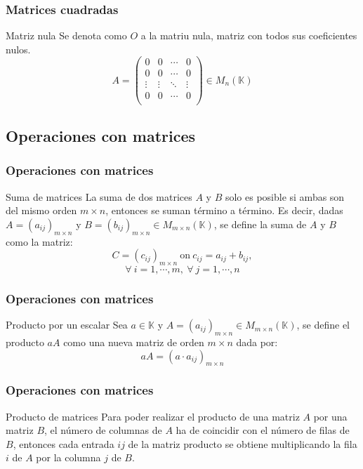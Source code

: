 \documentclass[aspectratio=169]{beamer}
\begin{document}
 \begin{frame}
  \frametitle{Matrices cuadradas}
   \begin{block}{Matriz nula}
Se denota como $O$ a la matriu nula, matriz con todos sus coeficientes nulos.\[ A =  \left(\begin{matrix} %
      0 & 0 & \cdots & 0 \\
      0 & 0 & \cdots & 0 \\
  \vdots & \vdots & \ddots & \vdots \\
   0 & 0 & \cdots & 0 \\
    \end{matrix}\right) \in M_{ n} (\mathbb{K})\]
  \end{block}
 \end{frame}
 
 
 
 
 
 \subsection{Operaciones con matrices}

 \begin{frame}
  \frametitle{Operaciones con matrices}
   \begin{block}{Suma de matrices}
La suma de dos matrices $A$ y $B$ solo es posible si ambas son del mismo orden $m\times n$, entonces se suman t\'ermino a t\'ermino. Es decir, dadas $A=(a_{ij})_{m\times n}$ y $B=(b_{ij})_{m\times n}\in M_{m\times n}(\mathbb{K})$, se define la suma de $A$ y $B$ como la matriz: 
\[C=(c_{ij})_{m\times n}\ \mathrm{on} \ c_{ij} = a_{ij}+b_{ij},\]
\[ \forall \ i=1,\cdots, m, \ \forall\ j=1,\cdots,n\]  
  \end{block}
 \end{frame}


 \begin{frame}
  \frametitle{Operaciones con matrices}
   \begin{block}{Producto por un escalar}
Sea $a \in \mathbb{K}$ y $A = (a_{ij})_{m\times n} \in M_{m\times n}(\mathbb{K})$, se define el producto $aA$ como una nueva matriz de orden $m \times n$ dada por:
\[aA = (a \cdot a_{ij})_{m\times n}\]
  \end{block}
 \end{frame}
 
 
  \begin{frame}
  \frametitle{Operaciones con matrices}
   \begin{block}{Producto de matrices}
Para poder realizar el producto de una matriz $A$ por una matriz $B$, el n\'umero de columnas de $A$ ha de coincidir con el n\'umero de filas de $B$, entonces cada entrada $ij$ de la matriz producto se obtiene multiplicando la fila $i$ de $A$ por la columna $j$ de $B$. 
  \end{block}
 \end{frame}
 
\end{document}
